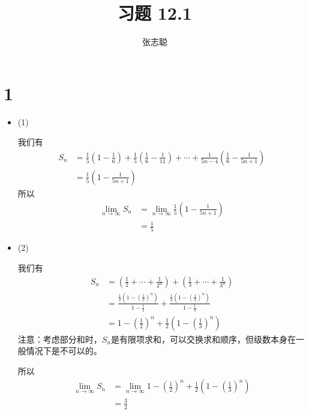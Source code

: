 \documentclass{article}
\begin{document}
\title{习题 12.1}
\author{张志聪}
\maketitle

\section*{1}

\begin{itemize}
  \item (1)

        我们有
        \begin{align*}
          S_n & = \frac{1}{5} (1 - \frac{1}{6}) + \frac{1}{5} (\frac{1}{6} - \frac{1}{11}) + \cdots + \frac{1}{5n - 4} (\frac{1}{6} - \frac{1}{5n + 1}) \\
              & = \frac{1}{5} \left( 1 - \frac{1}{5n + 1} \right)
        \end{align*}
        所以
        \begin{align*}
          \lim\limits_{n \to \infty} S_n & = \lim\limits_{n \to \infty} \frac{1}{5} \left( 1 - \frac{1}{5n + 1} \right) \\
                                         & = \frac{1}{5}
        \end{align*}

  \item (2)

        我们有
        \begin{align*}
          S_n & = (\frac{1}{2} + \cdots + \frac{1}{2^n}) + (\frac{1}{3} + \cdots + \frac{1}{3^n})                                   \\
              & = \frac{\frac{1}{2}(1- (\frac{1}{2})^n)}{1 - \frac{1}{2}} + \frac{\frac{1}{3}(1- (\frac{1}{3})^n)}{1 - \frac{1}{3}} \\
              & = 1- (\frac{1}{2})^n + \frac{1}{2}(1 - (\frac{1}{3})^n)
        \end{align*}
        注意：考虑部分和时，$S_n$是有限项求和，可以交换求和顺序，但级数本身在一般情况下是不可以的。

        所以
        \begin{align*}
          \lim\limits_{n \to \infty} S_n & = \lim\limits_{n \to \infty} 1- (\frac{1}{2})^n + \frac{1}{2}(1 - (\frac{1}{3})^n) \\
                                         & = \frac{3}{2}
        \end{align*}


\end{itemize}
\end{document}
